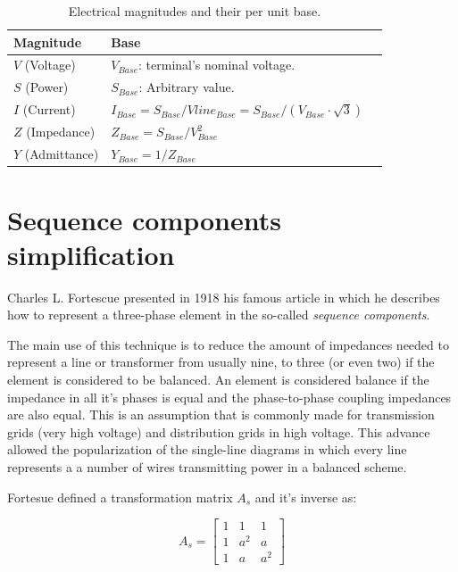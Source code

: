 \documentclass{tufte-book}
\begin{document}
\bigskip
\begin{table}[h!]
\begin{center}
\footnotesize
\begin{tabular}{lll}
\toprule
Magnitude &  Base\\
\midrule
$V$ (Voltage) & $V_{Base}$: terminal's nominal voltage. \\
$S$ (Power) & $S_{Base}$: Arbitrary value. \\
$I$ (Current) & $I_{Base} = S_{Base} / Vline_{Base} = S_{Base} / (V_{Base} \cdot \sqrt{3})$ \\
$Z$ (Impedance) & $Z_{Base} = S_{Base} / V_{Base}^2$ \\
$Y$ (Admittance) & $Y_{Base} = 1 / Z_{Base}$ \\
\bottomrule
\end{tabular}
\end{center}
  \caption{Electrical magnitudes and their per unit base.}
  \label{magnitudes_and_their_base}
\end{table}


\section{Sequence components simplification}

Charles L. Fortescue presented in 1918 his famous article \cite{fortescue1918method} in which he describes how to represent a three-phase element in the so-called \textit{sequence components}.

The main use of this technique is to reduce the amount of impedances needed to represent a line or transformer from usually nine, to three (or even two) if the element is considered to be balanced. An element is considered balance if the impedance in all it's phases is equal and the phase-to-phase coupling impedances are also equal. This is an assumption that is commonly made for transmission grids (very high voltage) and distribution grids in high voltage. This advance allowed the popularization of the single-line diagrams in which every line represents a  a number of wires transmitting power in a balanced scheme.

Fortesue defined a transformation matrix $A_s$ and it's inverse as:

\begin{equation}
A_s = \left[ \begin{array}{ccc}
1 & 1 & 1 \\
1 & a^2 & a \\
1 & a & a^2
\end{array} \right]
\end{equation}
\end{document}
